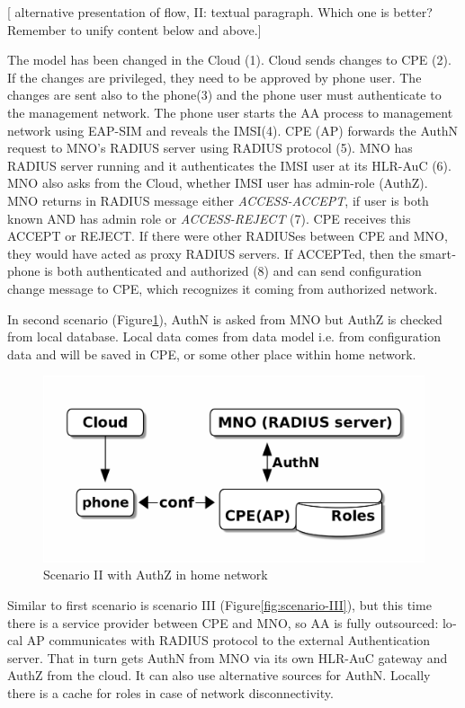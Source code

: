 \documentclass[12pt,a4paper,english]{tutthesis}
\begin{document}
\begin{otherlanguage}{english}
[ alternative presentation of flow, II: textual paragraph. Which one
is better? Remember to unify content below and above.] 

The model has been changed in the Cloud (1). Cloud sends changes to CPE
(2).  If the changes are privileged, they need to be approved by phone
user. The changes are sent also to the phone(3) and the phone user must
authenticate  to the management network.  The phone user starts the
AA process to management network using EAP-SIM and reveals
the IMSI(4).  CPE (AP) forwards  the AuthN request to MNO's RADIUS server
using RADIUS protocol (5).  MNO has RADIUS server running and it
authenticates the IMSI user at its HLR-AuC (6). MNO also asks from
the Cloud, whether IMSI user has admin-role (AuthZ). 
MNO returns in RADIUS message either \emph{ACCESS-ACCEPT}, if
user is both known AND has admin role or \emph{ACCESS-REJECT} (7).  CPE
receives this ACCEPT or REJECT. If there were other RADIUSes between
CPE and MNO, they would have acted as proxy RADIUS servers.  If
ACCEPTed, then the smartphone is both authenticated and authorized (8) and can
send configuration change message to CPE, which recognizes it coming
from authorized network.



\label{scenario-ii}

In second scenario (Figure\ref{fig:scenario-II}), AuthN is asked from MNO but
AuthZ is checked from local database. Local data comes from data model
i.e. from configuration data and will be saved in CPE, or some other
place within home network.


\begin{figure}[htb]
\centering
\includegraphics[width=.9\linewidth]{scenII.png}
\caption{\label{fig:scenario-II}Scenario II with AuthZ in home network}
\end{figure}


\label{scenario-iii}

Similar to first scenario is scenario III (Figure\ref{fig:scenario-III}), 
but this time there is a service provider between CPE and MNO, so AA is fully outsourced:
local AP communicates with RADIUS protocol to the external
Authentication server. That in turn gets AuthN from MNO via its own
HLR-AuC gateway and AuthZ from the cloud. It can also use alternative
sources for AuthN.
Locally there is a cache for roles in case of network disconnectivity.


\end{otherlanguage}
\end{document}
